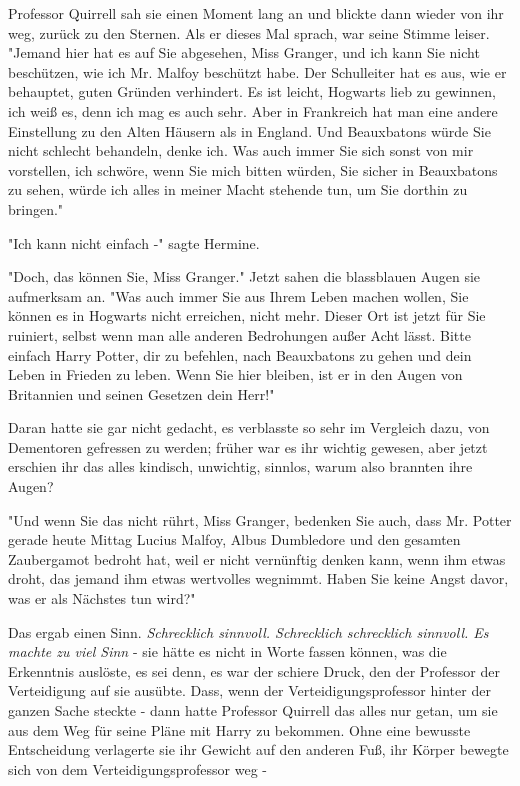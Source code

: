 {Professor Quirrell sah sie einen Moment lang an und blickte dann wieder von ihr weg, zurück zu den Sternen. Als er dieses Mal sprach, war seine Stimme leiser. "Jemand hier hat es auf Sie abgesehen, Miss Granger, und ich kann Sie nicht beschützen, wie ich Mr. Malfoy beschützt habe. Der Schulleiter hat es aus, wie er behauptet, guten Gründen verhindert. Es ist leicht, Hogwarts lieb zu gewinnen, ich weiß es, denn ich mag es auch sehr. Aber in Frankreich hat man eine andere Einstellung zu den Alten Häusern als in England. Und Beauxbatons würde Sie nicht schlecht behandeln, denke ich. Was auch immer Sie sich sonst von mir vorstellen, ich schwöre, wenn Sie mich bitten würden, Sie sicher in Beauxbatons zu sehen, würde ich alles in meiner Macht stehende tun, um Sie dorthin zu bringen."

"Ich kann nicht einfach -" sagte Hermine.

"Doch, das können Sie, Miss Granger." Jetzt sahen die blassblauen Augen sie aufmerksam an. "Was auch immer Sie aus Ihrem Leben machen wollen, Sie können es in Hogwarts nicht erreichen, nicht mehr. Dieser Ort ist jetzt für Sie ruiniert, selbst wenn man alle anderen Bedrohungen außer Acht lässt. Bitte einfach Harry Potter, dir zu befehlen, nach Beauxbatons zu gehen und dein Leben in Frieden zu leben. Wenn Sie hier bleiben, ist er in den Augen von Britannien und seinen Gesetzen dein Herr!"

Daran hatte sie gar nicht gedacht, es verblasste so sehr im Vergleich dazu, von Dementoren gefressen zu werden; früher war es ihr wichtig gewesen, aber jetzt erschien ihr das alles kindisch, unwichtig, sinnlos, warum also brannten ihre Augen?

"Und wenn Sie das nicht rührt, Miss Granger, bedenken Sie auch, dass Mr. Potter gerade heute Mittag Lucius Malfoy, Albus Dumbledore und den gesamten Zaubergamot bedroht hat, weil er nicht vernünftig denken kann, wenn ihm etwas droht, das jemand ihm etwas wertvolles wegnimmt. Haben Sie keine Angst davor, was er als Nächstes tun wird?"

Das ergab einen Sinn. \emph{Schrecklich sinnvoll. Schrecklich schrecklich sinnvoll. Es machte zu viel Sinn} - sie hätte es nicht in Worte fassen können, was die Erkenntnis auslöste, es sei denn, es war der schiere Druck, den der Professor der Verteidigung auf sie ausübte. Dass, wenn der Verteidigungsprofessor hinter der ganzen Sache steckte - dann hatte Professor Quirrell das alles nur getan, um sie aus dem Weg für seine Pläne mit Harry zu bekommen. Ohne eine bewusste Entscheidung verlagerte sie ihr Gewicht auf den anderen Fuß, ihr Körper bewegte sich von dem Verteidigungsprofessor weg -

}
